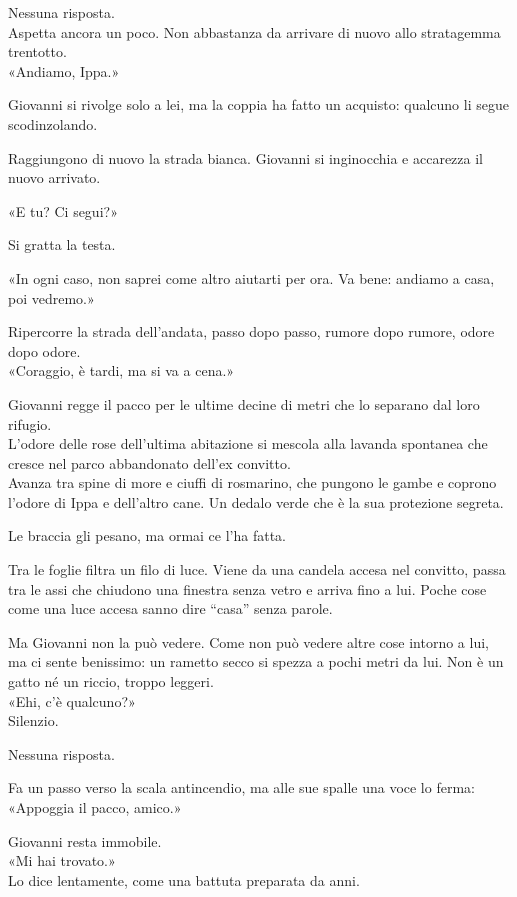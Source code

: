 \documentclass[10pt,oneside]{extbook}
\begin{document}
Nessuna risposta.\\

Aspetta ancora un poco. Non abbastanza da arrivare di nuovo allo stratagemma trentotto.\\

«Andiamo, Ippa.»

Giovanni si rivolge solo a lei, ma la coppia ha fatto un acquisto: qualcuno li segue scodinzolando.

Raggiungono di nuovo la strada bianca. Giovanni si inginocchia e accarezza il nuovo arrivato.

«E tu? Ci segui?»

Si gratta la testa.

«In ogni caso, non saprei come altro aiutarti per ora. Va bene: andiamo a casa, poi vedremo.»

Ripercorre la strada dell’andata, passo dopo passo, rumore dopo rumore, odore dopo odore.\\
«Coraggio, \`e tardi, ma si va a cena.»

Giovanni regge il pacco per le ultime decine di metri che lo separano dal loro rifugio.\\
L’odore delle rose dell’ultima abitazione si mescola alla lavanda spontanea che cresce nel parco abbandonato dell’ex convitto.\\
Avanza tra spine di more e ciuffi di rosmarino, che pungono le gambe e coprono l’odore di Ippa e dell’altro cane. Un dedalo verde che \`e la sua protezione segreta.

Le braccia gli pesano, ma ormai ce l’ha fatta.

Tra le foglie filtra un filo di luce. Viene da una candela accesa nel convitto, passa tra le assi che chiudono una finestra senza vetro e arriva fino a lui. Poche cose come una luce accesa sanno dire “casa” senza parole.

Ma Giovanni non la pu\`o vedere. Come non pu\`o vedere altre cose intorno a lui, ma ci sente benissimo: un rametto secco si spezza a pochi metri da lui. Non \`e un gatto n\'e un riccio, troppo leggeri.\\
«Ehi, c’\`e qualcuno?»\\
Silenzio.

Nessuna risposta.

Fa un passo verso la scala antincendio, ma alle sue spalle una voce lo ferma:\\
«Appoggia il pacco, amico.»

Giovanni resta immobile.\\
«Mi hai trovato.»\\
Lo dice lentamente, come una battuta preparata da anni.
\end{document}
